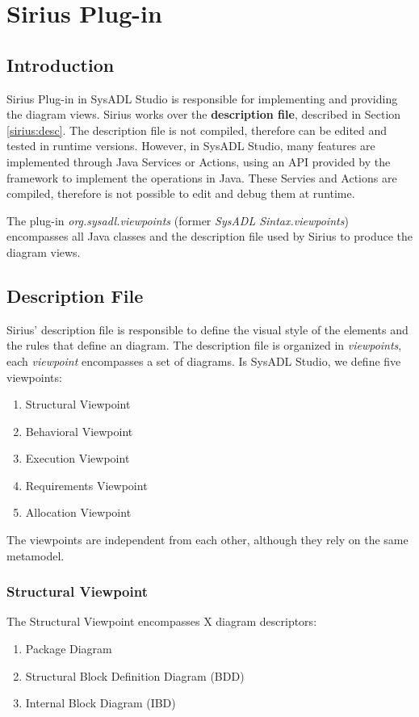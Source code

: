 \chapter{\label{sirius}Sirius Plug-in}
\section{\label{sirius:intro}Introduction}
Sirius Plug-in in SysADL Studio is responsible for implementing and providing the diagram views. Sirius works over the \textbf{description file}, described in Section \ref{sirius:desc}. The description file is not compiled, therefore can be edited and tested in runtime versions. However, in SysADL Studio, many features are implemented through Java Services or Actions, using an API provided by the framework to implement the operations in Java. These Servies and Actions are compiled, therefore is not possible to edit and debug them at runtime.

The plug-in \textit{org.sysadl.viewpoints} (former \textit{SysADL Sintax.viewpoints}) encompasses all Java classes and the description file used by Sirius to produce the diagram views.
\section{\label{sirius:desc}Description File}
Sirius' description file is responsible to define the visual style of the elements and the rules that define an diagram. The description file is organized in \textit{viewpoints}, each \textit{viewpoint} encompasses a set of diagrams. Is SysADL Studio, we define five viewpoints:
\begin{enumerate}
	\item Structural Viewpoint
	\item Behavioral Viewpoint
	\item Execution Viewpoint
	\item Requirements Viewpoint
	\item Allocation Viewpoint
\end{enumerate}

The viewpoints are independent from each other, although they rely on the same metamodel.

\subsection{Structural Viewpoint}
The Structural Viewpoint encompasses X diagram descriptors:
\begin{enumerate}
	\item Package Diagram
	\item Structural Block Definition Diagram (BDD)
	\item Internal Block Diagram (IBD)
\end{enumerate}


